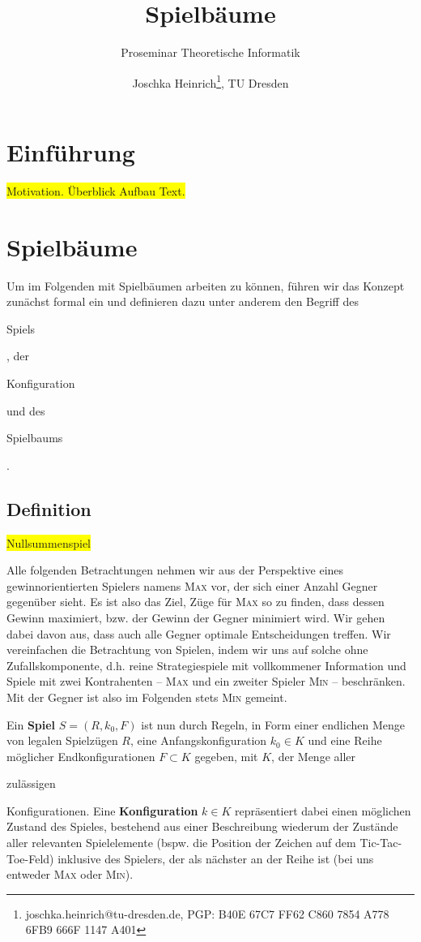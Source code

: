 \documentclass[a4paper,twoside]{scrartcl}
\title{Spielbäume}
\subtitle{Proseminar Theoretische Informatik}
\author{Joschka Heinrich\thanks{joschka.heinrich@tu-dresden.de, PGP: \textsc{B40E 67C7 FF62 C860 7854 A778 6FB9 666F 1147 A401}}, TU Dresden}
\newcommand\e[1]{\begin{em}#1\end{em}}
\newcommand\q[1]{\glqq #1\grqq}
\newcommand\todo[1]{\colorbox{yellow}{#1}}
\begin{document}
\maketitle



\section{Einführung}
\todo{Motivation. Überblick Aufbau Text.}



\section{Spielbäume}
Um im Folgenden mit Spielbäumen arbeiten zu können, führen wir das Konzept zunächst formal ein und definieren dazu unter anderem den Begriff des \e{Spiels}, der \e{Konfiguration} und des \e{Spielbaums}.


\subsection{Definition}

\todo{Nullsummenspiel}

Alle folgenden Betrachtungen nehmen wir aus der Perspektive eines gewinnorientierten Spielers namens \textsc{Max} vor, der sich einer Anzahl Gegner gegenüber sieht. Es ist also das Ziel, Züge für \textsc{Max} so zu finden, dass dessen Gewinn maximiert, bzw. der Gewinn der Gegner minimiert wird. Wir gehen dabei davon aus, dass auch alle Gegner optimale Entscheidungen treffen. Wir vereinfachen die Betrachtung von Spielen, indem wir uns auf solche ohne Zufallskomponente, d.h. reine Strategiespiele mit vollkommener Information und Spiele mit zwei Kontrahenten -- \textsc{Max} und ein zweiter Spieler \textsc{Min} -- beschränken. Mit \q{der Gegner} ist also im Folgenden stets \textsc{Min} gemeint. 

Ein \textbf{Spiel} $S = (R,k_0,F)$ ist nun durch Regeln, in Form einer endlichen Menge von legalen Spielzügen $R$, eine Anfangskonfiguration $k_0 \in K$ und eine Reihe möglicher Endkonfigurationen $F \subset K$ gegeben, mit $K$, der Menge aller \e{zulässigen} Konfigurationen. Eine \textbf{Konfiguration} $k \in K$ repräsentiert dabei einen möglichen Zustand des Spieles, bestehend aus einer Beschreibung wiederum der Zustände aller relevanten Spielelemente (bspw. die Position der Zeichen auf dem Tic-Tac-Toe-Feld) inklusive des Spielers, der als nächster an der Reihe ist (bei uns entweder \textsc{Max} oder \textsc{Min}).
\end{document}
